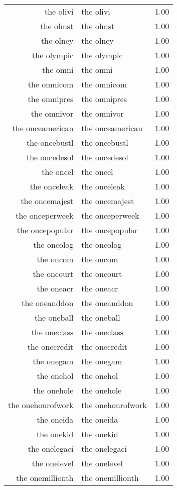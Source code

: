 \begin{table}[ht]
\begin{tabular}{rlr}
  the olivi & the olivi & 1.00 \\ 
  the olmst & the olmst & 1.00 \\ 
  the olney & the olney & 1.00 \\ 
  the olympic & the olympic & 1.00 \\ 
  the omni & the omni & 1.00 \\ 
  the omnicom & the omnicom & 1.00 \\ 
  the omnipres & the omnipres & 1.00 \\ 
  the omnivor & the omnivor & 1.00 \\ 
  the onceamerican & the onceamerican & 1.00 \\ 
  the oncebustl & the oncebustl & 1.00 \\ 
  the oncedesol & the oncedesol & 1.00 \\ 
  the oncel & the oncel & 1.00 \\ 
  the onceleak & the onceleak & 1.00 \\ 
  the oncemajest & the oncemajest & 1.00 \\ 
  the onceperweek & the onceperweek & 1.00 \\ 
  the oncepopular & the oncepopular & 1.00 \\ 
  the oncolog & the oncolog & 1.00 \\ 
  the oncom & the oncom & 1.00 \\ 
  the oncourt & the oncourt & 1.00 \\ 
  the oneacr & the oneacr & 1.00 \\ 
  the oneanddon & the oneanddon & 1.00 \\ 
  the oneball & the oneball & 1.00 \\ 
  the oneclass & the oneclass & 1.00 \\ 
  the onecredit & the onecredit & 1.00 \\ 
  the onegam & the onegam & 1.00 \\ 
  the onehol & the onehol & 1.00 \\ 
  the onehole & the onehole & 1.00 \\ 
  the onehourofwork & the onehourofwork & 1.00 \\ 
  the oneida & the oneida & 1.00 \\ 
  the onekid & the onekid & 1.00 \\ 
  the onelegaci & the onelegaci & 1.00 \\ 
  the onelevel & the onelevel & 1.00 \\ 
  the onemillionth & the onemillionth & 1.00 \\ 

\end{tabular}
\end{table}
